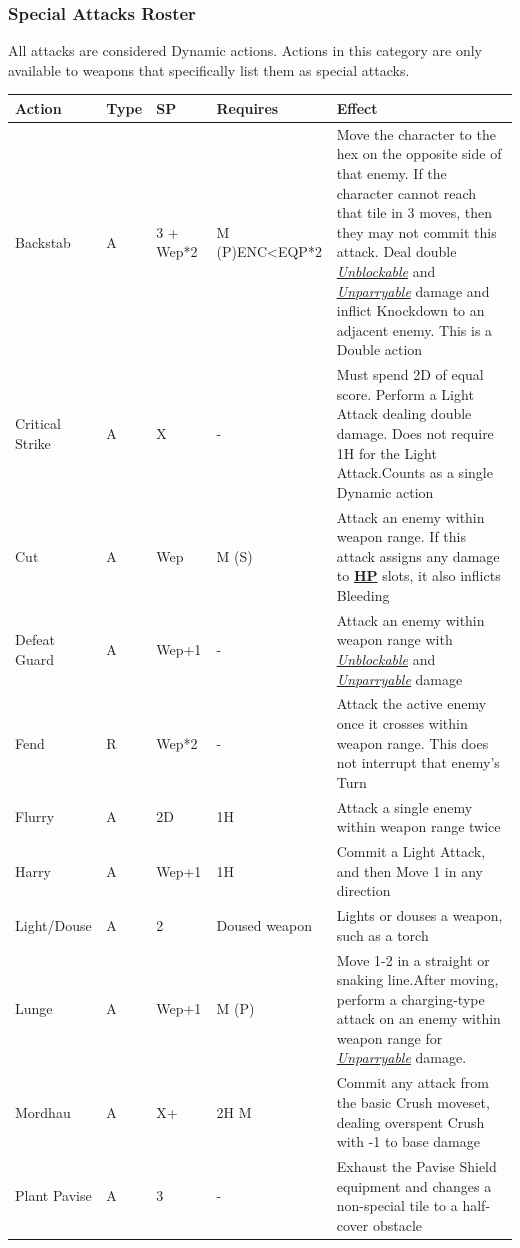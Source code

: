 \documentclass[12pt]{article}
\newcommand{\refto}[1]{\hyperlink{#1}{\textbf{#1}}}
\newcommand{\reftoit}[1]{\hyperlink{#1}{\emph{#1}}}
\begin{document}
\pagebreak

\subsubsection{Special Attacks Roster}
All attacks are considered Dynamic actions. Actions in this category are only available to weapons that specifically list them as special attacks.\\
\begin{center}
\begin{tabularx}{\textwidth}{p{}p{}p{}p{}p{}}
\hline
\rowcolor{white} \textbf{Action} & \textbf{Type} & \textbf{SP} & \textbf{Requires} & \textbf{Effect}\setcounter{rownum}{0}\\
\hline
Backstab & A & 3 + Wep*2 & M (P)\newline ENC<EQP*2 & Move the character to the hex on the opposite side of that enemy. If the character cannot reach that tile in 3 moves, then they may not commit this attack.\newline
Deal double \reftoit{Unblockable} and \reftoit{Unparryable} damage and inflict Knockdown to an adjacent enemy.\newline
This is a Double action\\
Critical Strike & A & X & - & Must spend 2D of equal score. Perform a Light Attack dealing double damage.\newline
Does not require 1H for the Light Attack.\newline Counts as a single Dynamic action\\
Cut & A & Wep & M (S) & Attack an enemy within weapon range. If this attack assigns any damage to \refto{HP} slots, it also inflicts Bleeding\\
Defeat Guard & A & Wep+1 & - & Attack an enemy within weapon range with \reftoit{Unblockable} and \reftoit{Unparryable} damage\\
Fend & R & Wep*2 & - & Attack the active enemy once it crosses within weapon range. This does not interrupt that enemy’s Turn \\
Flurry & A & 2D & 1H & Attack a single enemy within weapon range twice\\
Harry & A & Wep+1 & 1H & Commit a Light Attack, and then Move 1 in any direction \\
Light/Douse & A & 2 & Doused weapon & Lights or douses a weapon, such as a torch\\
Lunge & A & Wep+1 & M (P) & Move 1-2 in a straight or snaking line.\newline After moving, perform a charging-type attack on an enemy within weapon range for \reftoit{Unparryable} damage.\\
Mordhau & A & X+ & 2H M & Commit any attack from the basic Crush moveset, dealing overspent Crush with -1 to base damage\\
Plant Pavise & A & 3 & - & Exhaust the Pavise Shield equipment and changes a non-special tile to a half-cover obstacle\\
\hline
\end{tabularx}
\end{center}
\end{document}

